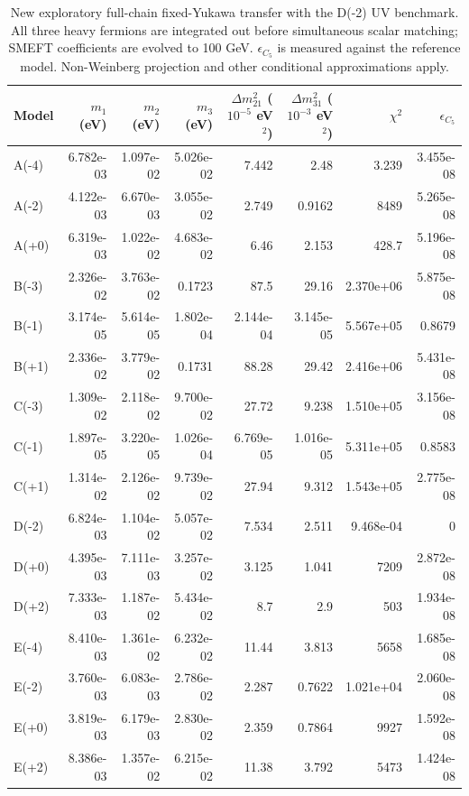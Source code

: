 \begin{table}[htbp]
\centering
\small
\setlength{\tabcolsep}{3.4pt}
\begin{tabular}{lrrrrrrr}
\hline
Model & $m_1$ (eV) & $m_2$ (eV) & $m_3$ (eV) & $\Delta m^2_{21}$ ($10^{-5}$ eV$^2$) & $\Delta m^2_{31}$ ($10^{-3}$ eV$^2$) & $\chi^2$ & $\epsilon_{C_5}$ \\
\hline
A(-4) & 6.782e-03 & 1.097e-02 & 5.026e-02 & 7.442 & 2.48 & 3.239 & 3.455e-08 \\
A(-2) & 4.122e-03 & 6.670e-03 & 3.055e-02 & 2.749 & 0.9162 & 8489 & 5.265e-08 \\
A(+0) & 6.319e-03 & 1.022e-02 & 4.683e-02 & 6.46 & 2.153 & 428.7 & 5.196e-08 \\
B(-3) & 2.326e-02 & 3.763e-02 & 0.1723 & 87.5 & 29.16 & 2.370e+06 & 5.875e-08 \\
B(-1) & 3.174e-05 & 5.614e-05 & 1.802e-04 & 2.144e-04 & 3.145e-05 & 5.567e+05 & 0.8679 \\
B(+1) & 2.336e-02 & 3.779e-02 & 0.1731 & 88.28 & 29.42 & 2.416e+06 & 5.431e-08 \\
C(-3) & 1.309e-02 & 2.118e-02 & 9.700e-02 & 27.72 & 9.238 & 1.510e+05 & 3.156e-08 \\
C(-1) & 1.897e-05 & 3.220e-05 & 1.026e-04 & 6.769e-05 & 1.016e-05 & 5.311e+05 & 0.8583 \\
C(+1) & 1.314e-02 & 2.126e-02 & 9.739e-02 & 27.94 & 9.312 & 1.543e+05 & 2.775e-08 \\
D(-2) & 6.824e-03 & 1.104e-02 & 5.057e-02 & 7.534 & 2.511 & 9.468e-04 & 0 \\
D(+0) & 4.395e-03 & 7.111e-03 & 3.257e-02 & 3.125 & 1.041 & 7209 & 2.872e-08 \\
D(+2) & 7.333e-03 & 1.187e-02 & 5.434e-02 & 8.7 & 2.9 & 503 & 1.934e-08 \\
E(-4) & 8.410e-03 & 1.361e-02 & 6.232e-02 & 11.44 & 3.813 & 5658 & 1.685e-08 \\
E(-2) & 3.760e-03 & 6.083e-03 & 2.786e-02 & 2.287 & 0.7622 & 1.021e+04 & 2.060e-08 \\
E(+0) & 3.819e-03 & 6.179e-03 & 2.830e-02 & 2.359 & 0.7864 & 9927 & 1.592e-08 \\
E(+2) & 8.386e-03 & 1.357e-02 & 6.215e-02 & 11.38 & 3.792 & 5473 & 1.424e-08 \\
\hline
\end{tabular}
\caption{New exploratory full-chain fixed-Yukawa transfer with the D(-2) UV benchmark. All three heavy fermions are integrated out before simultaneous scalar matching; SMEFT coefficients are evolved to 100 GeV. $\epsilon_{C_5}$ is measured against the reference model. Non-Weinberg projection and other conditional approximations apply.}
\label{tab:generalised_b1}
\end{table}
